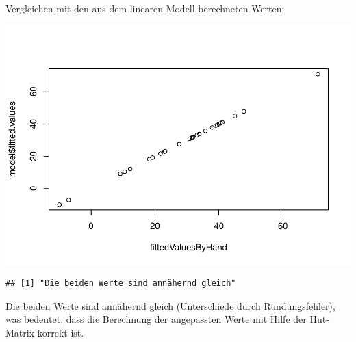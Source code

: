 \documentclass[]{article}
\newenvironment{Shaded}{\begin{snugshade}}{\end{snugshade}}
\newcommand{\ControlFlowTok}[1]{\textcolor[rgb]{0.13,0.29,0.53}{\textbf{#1}}}
\newcommand{\FloatTok}[1]{\textcolor[rgb]{0.00,0.00,0.81}{#1}}
\newcommand{\KeywordTok}[1]{\textcolor[rgb]{0.13,0.29,0.53}{\textbf{#1}}}
\newcommand{\NormalTok}[1]{#1}
\newcommand{\OperatorTok}[1]{\textcolor[rgb]{0.81,0.36,0.00}{\textbf{#1}}}
\newcommand{\StringTok}[1]{\textcolor[rgb]{0.31,0.60,0.02}{#1}}
\begin{document}
Vergleichen mit den aus dem linearen Modell berechneten Werten:

\begin{Shaded}
\end{Shaded}

\includegraphics{Test_files/figure-latex/unnamed-chunk-15-1.pdf}

\begin{Shaded}
\end{Shaded}

\begin{verbatim}
## [1] "Die beiden Werte sind annähernd gleich"
\end{verbatim}

Die beiden Werte sind annähernd gleich (Unterschiede durch Rundungsfehler), was bedeutet, dass die Berechnung der angepassten Werte mit Hilfe der Hut-Matrix korrekt ist.
\end{document}
